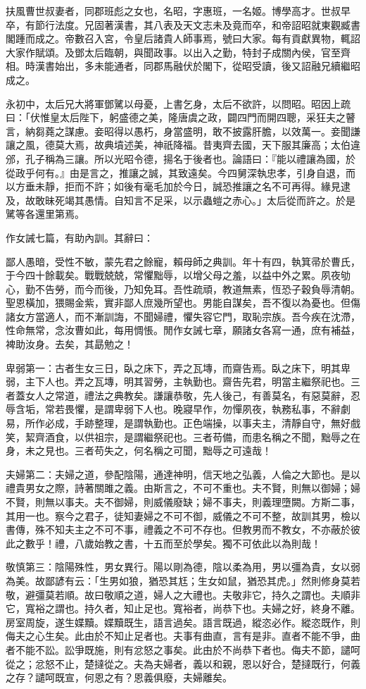 \begin{pinyinscope}
扶風曹世叔妻者，同郡班彪之女也，名昭，字惠班，一名姬。博學高才。世叔早卒，有節行法度。兄固著漢書，其八表及天文志未及竟而卒，和帝詔昭就東觀臧書閣踵而成之。帝數召入宮，令皇后諸貴人師事焉，號曰大家。每有貢獻異物，輒詔大家作賦頌。及鄧太后臨朝，與聞政事。以出入之勤，特封子成關內侯，官至齊相。時漢書始出，多未能通者，同郡馬融伏於閣下，從昭受讀，後又詔融兄續繼昭成之。

永初中，太后兄大將軍鄧騭以母憂，上書乞身，太后不欲許，以問昭。昭因上疏曰：「伏惟皇太后陛下，躬盛德之美，隆唐虞之政，闢四門而開四聰，采狂夫之瞽言，納芻蕘之謀慮。妾昭得以愚朽，身當盛明，敢不披露肝膽，以效萬一。妾聞謙讓之風，德莫大焉，故典墳述美，神祇降福。昔夷齊去國，天下服其廉高；太伯違邠，孔子稱為三讓。所以光昭令德，揚名于後者也。論語曰：『能以禮讓為國，於從政乎何有。』由是言之，推讓之誠，其致遠矣。今四舅深執忠孝，引身自退，而以方垂未靜，拒而不許；如後有毫毛加於今日，誠恐推讓之名不可再得。緣見逮及，故敢昧死竭其愚情。自知言不足采，以示蟲螘之赤心。」太后從而許之。於是騭等各還里第焉。

作女誡七篇，有助內訓。其辭曰：

鄙人愚暗，受性不敏，蒙先君之餘寵，賴母師之典訓。年十有四，執箕帚於曹氏，于今四十餘載矣。戰戰兢兢，常懼黜辱，以增父母之羞，以益中外之累。夙夜劬心，勤不告勞，而今而後，乃知免耳。吾性疏頑，教道無素，恆恐子穀負辱清朝。聖恩橫加，猥賜金紫，實非鄙人庶幾所望也。男能自謀矣，吾不復以為憂也。但傷諸女方當適人，而不漸訓誨，不聞婦禮，懼失容它門，取恥宗族。吾今疾在沈滯，性命無常，念汝曹如此，每用惆悵。閒作女誡七章，願諸女各寫一通，庶有補益，裨助汝身。去矣，其勗勉之！

卑弱第一：古者生女三日，臥之床下，弄之瓦塼，而齋告焉。臥之床下，明其卑弱，主下人也。弄之瓦塼，明其習勞，主執勤也。齋告先君，明當主繼祭祀也。三者蓋女人之常道，禮法之典教矣。謙讓恭敬，先人後己，有善莫名，有惡莫辭，忍辱含垢，常若畏懼，是謂卑弱下人也。晚寢早作，勿憚夙夜，執務私事，不辭劇易，所作必成，手跡整理，是謂執勤也。正色端操，以事夫主，清靜自守，無好戲笑，絜齊酒食，以供祖宗，是謂繼祭祀也。三者苟備，而患名稱之不聞，黜辱之在身，未之見也。三者苟失之，何名稱之可聞，黜辱之可遠哉！

夫婦第二：夫婦之道，參配陰陽，通達神明，信天地之弘義，人倫之大節也。是以禮貴男女之際，詩著關雎之義。由斯言之，不可不重也。夫不賢，則無以御婦；婦不賢，則無以事夫。夫不御婦，則威儀廢缺；婦不事夫，則義理墮闕。方斯二事，其用一也。察今之君子，徒知妻婦之不可不御，威儀之不可不整，故訓其男，檢以書傳，殊不知夫主之不可不事，禮義之不可不存也。但教男而不教女，不亦蔽於彼此之數乎！禮，八歲始教之書，十五而至於學矣。獨不可依此以為則哉！

敬慎第三：陰陽殊性，男女異行。陽以剛為德，陰以柔為用，男以彊為貴，女以弱為美。故鄙諺有云：「生男如狼，猶恐其尪；生女如鼠，猶恐其虎。」然則修身莫若敬，避彊莫若順。故曰敬順之道，婦人之大禮也。夫敬非它，持久之謂也。夫順非它，寬裕之謂也。持久者，知止足也。寬裕者，尚恭下也。夫婦之好，終身不離。房室周旋，遂生媟黷。媟黷既生，語言過矣。語言既過，縱恣必作。縱恣既作，則侮夫之心生矣。此由於不知止足者也。夫事有曲直，言有是非。直者不能不爭，曲者不能不訟。訟爭既施，則有忿怒之事矣。此由於不尚恭下者也。侮夫不節，譴呵從之；忿怒不止，楚撻從之。夫為夫婦者，義以和親，恩以好合，楚撻既行，何義之存？譴呵既宣，何恩之有？恩義俱廢，夫婦離矣。


\end{pinyinscope}
